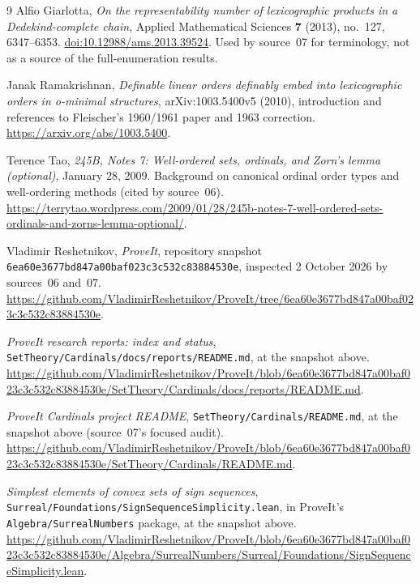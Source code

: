 \documentclass[11pt,a4paper]{article}
\theoremstyle{definition}
\theoremstyle{remark}
\begin{document}
\begin{thebibliography}{9}
Alfio Giarlotta,
\emph{On the representability number of lexicographic products in a
Dedekind-complete chain},
Applied Mathematical Sciences \textbf{7} (2013), no.~127, 6347--6353.
\href{https://doi.org/10.12988/ams.2013.39524}{doi:10.12988/ams.2013.39524}.
Used by source~07 for terminology, not as a source of the full-enumeration
results.

Janak Ramakrishnan,
\emph{Definable linear orders definably embed into lexicographic orders
in o-minimal structures}, arXiv:1003.5400v5 (2010), introduction and
references to Fleischer's 1960/1961 paper and 1963 correction.
\url{https://arxiv.org/abs/1003.5400}.

Terence Tao,
\emph{245B, Notes 7: Well-ordered sets, ordinals, and Zorn's lemma
(optional)}, January 28, 2009. Background on canonical ordinal order types
and well-ordering methods (cited by source~06).
\url{https://terrytao.wordpress.com/2009/01/28/245b-notes-7-well-ordered-sets-ordinals-and-zorns-lemma-optional/}.

Vladimir Reshetnikov,
\emph{ProveIt}, repository snapshot
\nolinkurl{6ea60e3677bd847a00baf023c3c532c83884530e}, inspected 2 October 2026
by sources~06 and~07.
\url{https://github.com/VladimirReshetnikov/ProveIt/tree/6ea60e3677bd847a00baf023c3c532c83884530e}.

\emph{ProveIt research reports: index and status},
\nolinkurl{SetTheory/Cardinals/docs/reports/README.md}, at the snapshot above.
\url{https://github.com/VladimirReshetnikov/ProveIt/blob/6ea60e3677bd847a00baf023c3c532c83884530e/SetTheory/Cardinals/docs/reports/README.md}.

\emph{ProveIt Cardinals project README},
\nolinkurl{SetTheory/Cardinals/README.md}, at the snapshot above
(source~07's focused audit).
\url{https://github.com/VladimirReshetnikov/ProveIt/blob/6ea60e3677bd847a00baf023c3c532c83884530e/SetTheory/Cardinals/README.md}.

\emph{Simplest elements of convex sets of sign sequences},
\nolinkurl{Surreal/Foundations/SignSequenceSimplicity.lean}, in ProveIt's
\texttt{Algebra/SurrealNumbers} package, at the snapshot above.
\url{https://github.com/VladimirReshetnikov/ProveIt/blob/6ea60e3677bd847a00baf023c3c532c83884530e/Algebra/SurrealNumbers/Surreal/Foundations/SignSequenceSimplicity.lean}.

\end{thebibliography}
\end{document}
